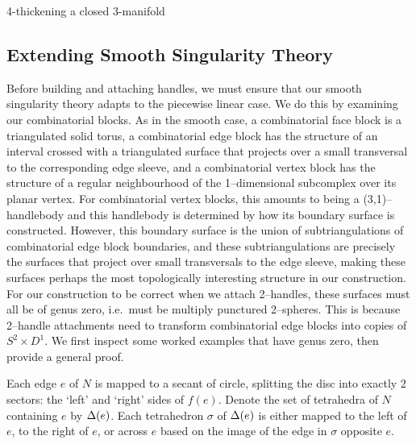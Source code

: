 \begin{algorithm}[h!]
	\caption{4-thickening a closed 3-manifold}
	\label{alg:4-thickening}
\end{algorithm}

\subsection{Extending Smooth Singularity Theory}

Before building and attaching handles, we must ensure that our smooth singularity theory adapts to the piecewise linear case.
We do this by examining our combinatorial blocks.
As in the smooth case, a combinatorial face block is a triangulated solid torus, a combinatorial edge block has the structure of an interval crossed with a triangulated surface that projects over a small transversal to the corresponding edge sleeve, and a combinatorial vertex block has the structure of a regular neighbourhood of the 1--dimensional subcomplex over its planar vertex.
For combinatorial vertex blocks, this amounts to being a (3,1)--handlebody and this handlebody is determined by how its boundary surface is constructed.
However, this boundary surface is the union of subtriangulations of combinatorial edge block boundaries, and these subtriangulations are precisely the surfaces that project over small transversals to the edge sleeve, making these surfaces perhaps the most topologically interesting structure in our construction.
For our construction to be correct when we attach 2--handles, these surfaces must all be of genus zero, i.e.\ must be multiply punctured 2--spheres.
This is because 2--handle attachments need to transform combinatorial edge blocks into copies of $S^2\times D^1$.
We first inspect some worked examples that have genus zero, then provide a general proof.

Each edge $e$ of $N$ is mapped to a secant of circle, splitting the disc into exactly 2 sectors: the `left' and `right' sides of $f(e)$.
Denote the set of tetrahedra of $N$ containing $e$ by $\Delta(e)$.
Each tetrahedron $\sigma$ of  $\Delta(e)$ is either mapped to the left of $e$, to the right of $e$, or across $e$ based on the image of the edge in $\sigma$ opposite $e$.

